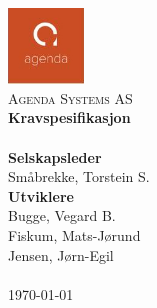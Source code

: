 \documentclass[12pt,a4paper] {report}
\begin{document}
\begin{titlepage}
	\begin{center}
		
		\includegraphics[width=0.15\textwidth]{img/agenda_logo.jpg}~\\[1cm]
		
		\textsc{\LARGE Agenda Systems AS}\\[3.5cm]
		
		{ \huge \bfseries Kravspesifikasjon}\\[0.5cm]
		\HRule \\[0.4cm]
		{\large \textbf{Selskapsleder}}\\
		{\large Sm\aa brekke, Torstein S.}\\[0.6cm]
		{\large \textbf{Utviklere}}\\
		{\large Bugge, Vegard B.}\\
		{\large Fiskum, Mats-J\o rund}\\
		{\large Jensen, J\o rn-Egil}\\[0.2cm]
		\HRule \\[1.5cm]
		
		\vfill
		{\large \today}
		
	\end{center}
\end{titlepage}

\tableofcontents %






\end{document}
